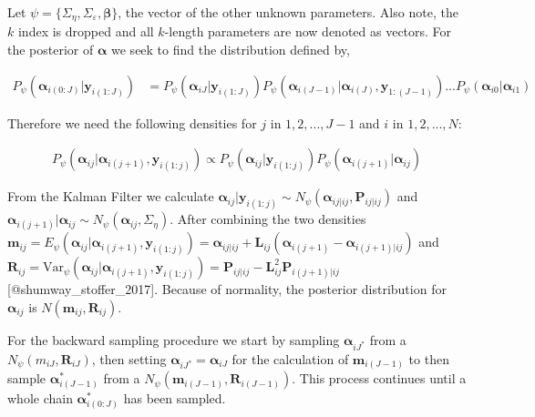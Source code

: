 \documentclass[
]{article}
\begin{document}
Let \(\psi = \{\Sigma_\eta, \Sigma_\varepsilon, \boldsymbol{\beta}\}\), the vector of the other unknown parameters. Also note, the \(k\) index is dropped and all \(k\)-length parameters are now denoted as vectors. For the posterior of \(\boldsymbol{\alpha}\) we seek to find the distribution defined by,

\begin{equation*}
\begin{aligned}
P_\psi(\boldsymbol{\alpha}_{i(0:J)}|\boldsymbol{y}_{i(1:J)}) &=  P_\psi(\boldsymbol{\alpha}_{iJ}|\boldsymbol{y}_{i(1:J)})P_\psi(\boldsymbol{\alpha}_{i(J-1)}|\boldsymbol{\alpha}_{i(J)}, \boldsymbol{y}_{1:(J-1)}) ...  P_\psi(\boldsymbol{\alpha}_{i0}|\boldsymbol{\alpha}_{i1})
\end{aligned}
\end{equation*}

Therefore we need the following densities for \(j\) in \(1, 2, ..., J-1\) and \(i\) in \(1, 2, ..., N\):

\begin{equation*}
\begin{aligned}
P_\psi(\boldsymbol{\alpha}_{ij}|\boldsymbol{\alpha}_{i(j+1)}, \boldsymbol{y}_{i(1:j)}) \propto P_\psi(\boldsymbol{\alpha}_{ij}| \boldsymbol{y}_{i(1:j)})P_\psi(\boldsymbol{\alpha}_{i(j+1)}| \boldsymbol{\alpha}_{ij})
\end{aligned}
\end{equation*}

From the Kalman Filter we calculate \(\boldsymbol{\alpha}_{ij}|\boldsymbol{y}_{i(1:j)} \sim N_\psi(\boldsymbol{\alpha}_{ij|ij}, \boldsymbol{P}_{ij|ij})\) and \(\boldsymbol{\alpha}_{i(j+1)}|\boldsymbol{\alpha}_{ij} \sim N_\psi(\boldsymbol{\alpha}_{ij}, \Sigma_\eta)\). After combining the two densities \(\boldsymbol{m}_{ij} = E_\psi(\boldsymbol{\alpha}_{ij}| \boldsymbol{\alpha}_{i(j+1)},\boldsymbol{y}_{i(1:j)}) = \boldsymbol{\alpha}_{ij|ij} + \boldsymbol{L}_{ij} (\boldsymbol{\alpha}_{i(j+1)} - \boldsymbol{\alpha}_{i(j+1)|ij})\) and \(\boldsymbol{R}_{ij} = \text{Var}_\psi(\boldsymbol{\alpha}_{ij}| \boldsymbol{\alpha}_{i(j+1)},\boldsymbol{y}_{i(1:j)})= \boldsymbol{P}_{ij|ij} - \boldsymbol{L}_{ij}^2 \boldsymbol{P}_{i(j+1)|ij}\) {[}@shumway\_stoffer\_2017{]}. Because of normality, the posterior distribution for \(\boldsymbol{\alpha}_{ij}\) is \(N(\boldsymbol{m}_{ij}, \boldsymbol{R}_{ij})\).

For the backward sampling procedure we start by sampling \(\boldsymbol{\alpha}_{iJ^*}\) from a \(N_\psi(m_{iJ}, \boldsymbol{R}_{iJ})\), then setting \(\boldsymbol{\alpha}_{iJ^*} = \boldsymbol{\alpha}_{iJ}\) for the calculation of \(\boldsymbol{m}_{i(J-1)}\) to then sample \(\boldsymbol{\alpha}_{i(J-1)}^*\) from a \(N_\psi(\boldsymbol{m}_{i(J-1)}, \boldsymbol{R}_{i(J-1)})\). This process continues until a whole chain \(\boldsymbol{\alpha}_{i(0:J)}^*\) has been sampled.
\end{document}
